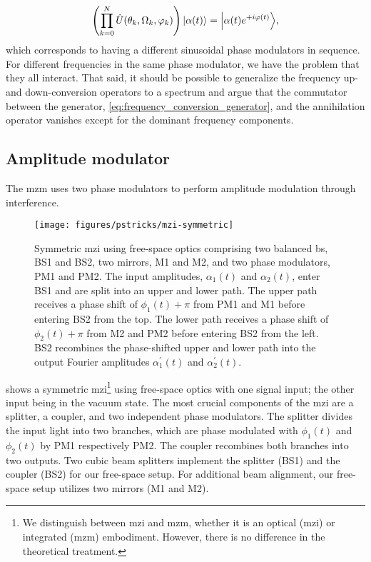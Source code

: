 \begin{equation}
	\left(
		\prod^N_{k=0}
		\hat{U}(\theta_k,\Omega_k,\varphi_k)
	\right)
	\ket*{\alpha(t)}
	=
	\ket*{\alpha(t)e^{+i\varphi(t)}}
	,
\end{equation}
which corresponds to having a different sinusoidal phase modulators in sequence.
For different frequencies in the same phase modulator, we have the problem that they all interact.
That said, it should be possible to generalize the frequency up- and down-conversion operators to a spectrum and argue that the commutator between the generator, \cref{eq:frequency_conversion_generator}, and the annihilation operator vanishes except for the dominant frequency components.

\subsection{Amplitude modulator}

The \gls{mzm} uses two phase modulators to perform amplitude modulation through interference.
\begin{figure}[htb]
	\centering
	\texttt{[image: figures/pstricks/mzi-symmetric]}
	\caption{Symmetric \gls{mzi} using free-space optics comprising two balanced \gls{bs}, BS1 and BS2, two mirrors, M1 and M2, and two phase modulators, PM1 and PM2. The input amplitudes, $\alpha_1(t)$ and $\alpha_2(t)$, enter BS1 and are split into an upper and lower path. The upper path receives a phase shift of $\phi_1(t)+\pi$ from PM1 and M1 before entering BS2 from the top. The lower path receives a phase shift of $\phi_2(t)+\pi$ from M2 and PM2 before entering BS2 from the left. BS2 recombines the phase-shifted upper and lower path into the output Fourier amplitudes $\alpha_1^\prime(t)$ and $\alpha_2^\prime(t)$.}\label{fig:mzi_symmetric}
\end{figure}
 shows a symmetric \gls{mzi}\footnote{We distinguish between \gls{mzi} and \gls{mzm}, whether it is an optical (\gls{mzi}) or integrated (\gls{mzm}) embodiment. However, there is no difference in the theoretical treatment.} using free-space optics with one signal input; the other input being in the vacuum state.
The most crucial components of the \gls{mzi} are a splitter, a coupler, and two independent phase modulators.
The splitter divides the input light into two branches, which are phase modulated with $\phi_1(t)$ and $\phi_2(t)$ by PM1 respectively PM2.
The coupler recombines both branches into two outputs.
Two cubic beam splitters implement the splitter (BS1) and the coupler (BS2) for our free-space setup.
For additional beam alignment, our free-space setup utilizes two mirrors (M1 and M2).

